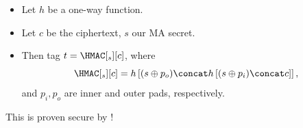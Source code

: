 \begin{frame}
  \begin{solution}
    \begin{itemize}
      \item Let \(h\) be a one-way function.
      \item Let \(c\) be the ciphertext, \(s\) our \ac{MA} secret.

        \pause{}

      \item Then tag \(t = \HMAC[_s][c]\), where \[
          \HMAC[_s][c] = h\left[
            (s\oplus p_o)\concat h\left[ (s\oplus p_i)\concat c \right]
          \right],
        \] and \(p_i, p_o\) are inner and outer pads, respectively.
    \end{itemize}
  \end{solution}

  \pause{}

  \begin{remark}
    This is proven secure by \textcite{HMAC}!
  \end{remark}
\end{frame}

